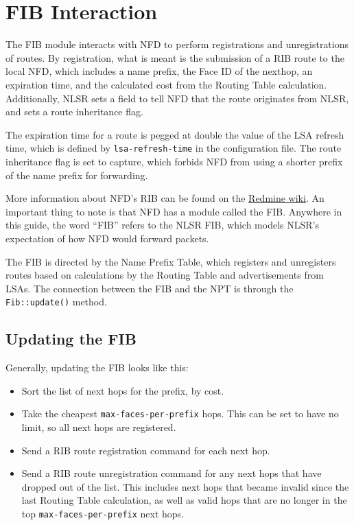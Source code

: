\section{FIB Interaction}
\label{sec:fib}

The FIB module interacts with NFD to perform registrations and
unregistrations of routes. By registration, what is meant is the
submission of a RIB route to the local NFD, which includes a name
prefix, the Face ID of the nexthop, an expiration time, and the
calculated cost from the Routing Table calculation. Additionally, NLSR
sets a field to tell NFD that the route originates from NLSR, and sets
a route inheritance flag.

The expiration time for a route is pegged at double the value of the
LSA refresh time, which is defined by \texttt{lsa-refresh-time} in the
configuration file. The route inheritance flag is set to capture,
which forbids NFD from using a shorter prefix of the name prefix for
forwarding.

More information about NFD's RIB can be found on the
\href{https://redmine.named-data.net/projects/nfd/wiki/RibMgmt}{Redmine
  wiki}. An important thing to note is that NFD has a module called
the FIB. Anywhere in this guide, the word ``FIB'' refers to the NLSR
FIB, which models NLSR's expectation of how NFD would forward packets.

The FIB is directed by the Name Prefix Table, which registers and
unregisters routes based on calculations by the Routing Table and
advertisements from LSAs. The connection between the FIB and the NPT
is through the \texttt{Fib::update()} method.

\subsection{Updating the FIB}
Generally, updating the FIB looks like this:
\begin{itemize}
\item Sort the list of next hops for the prefix, by cost.
\item Take the cheapest \texttt{max-faces-per-prefix} hops. This can be set to have no limit, so all next hops are registered.
\item Send a RIB route registration command for each next hop.
\item Send a RIB route unregistration command for any next hops that
  have dropped out of the list. This includes next hops that became
  invalid since the last Routing Table calculation, as well as valid
  hops that are no longer in the top \texttt{max-faces-per-prefix}
  next hops.
\end{itemize}

